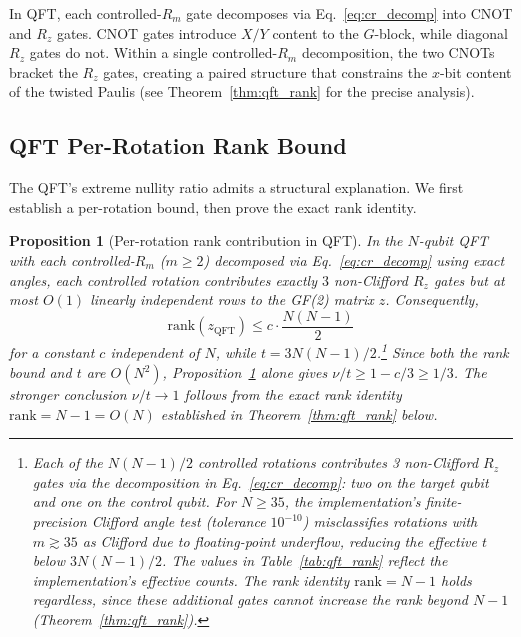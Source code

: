 \documentclass[a4paper,twocolumn,11pt]{quantumarticle}
\newtheorem{proposition}[theorem]{Proposition}
\begin{document}
In QFT, each controlled-$R_m$ gate decomposes via Eq.~\eqref{eq:cr_decomp} into CNOT and $R_z$ gates.
CNOT gates introduce $X/Y$ content to the $G$-block, while diagonal $R_z$ gates do not.
Within a single controlled-$R_m$ decomposition, the two CNOTs bracket the $R_z$ gates, creating a paired structure that constrains the $x$-bit content of the twisted Paulis (see Theorem~\ref{thm:qft_rank} for the precise analysis).

\subsection{QFT Per-Rotation Rank Bound}

The QFT's extreme nullity ratio admits a structural explanation.
We first establish a per-rotation bound, then prove the exact rank identity.

\begin{proposition}[Per-rotation rank contribution in QFT]
\label{prop:qft_rotation}
In the $N$-qubit QFT with each controlled-$R_m$ ($m \ge 2$) decomposed via Eq.~\eqref{eq:cr_decomp} using exact angles, each controlled rotation contributes exactly $3$ non-Clifford $R_z$ gates but at most $O(1)$ linearly independent rows to the GF(2) matrix $z$.
Consequently,
\begin{equation}
\label{eq:qft_per_rotation}
\mathrm{rank}(z_{\mathrm{QFT}}) \le c \cdot \frac{N(N-1)}{2}
\end{equation}
for a constant $c$ independent of $N$, while $t = 3N(N-1)/2$.\footnote{Each of the $N(N-1)/2$ controlled rotations contributes 3 non-Clifford $R_z$ gates via the decomposition in Eq.~\eqref{eq:cr_decomp}: two on the target qubit and one on the control qubit. For $N \ge 35$, the implementation's finite-precision Clifford angle test (tolerance $10^{-10}$) misclassifies rotations with $m \gtrsim 35$ as Clifford due to floating-point underflow, reducing the effective $t$ below $3N(N-1)/2$. The values in Table~\ref{tab:qft_rank} reflect the implementation's effective counts. The rank identity $\mathrm{rank} = N - 1$ holds regardless, since these additional gates cannot increase the rank beyond $N - 1$ (Theorem~\ref{thm:qft_rank}).}
Since both the rank bound and $t$ are $O(N^2)$, Proposition~\ref{prop:qft_rotation} alone gives $\nu/t \ge 1 - c/3 \ge 1/3$.
The stronger conclusion $\nu/t \to 1$ follows from the exact rank identity $\mathrm{rank} = N - 1 = O(N)$ established in Theorem~\ref{thm:qft_rank} below.
\end{proposition}
\end{document}
